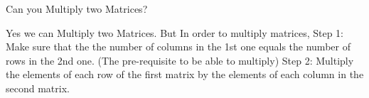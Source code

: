 \documentclass[11pt]{article}
\begin{document}
Can you Multiply two Matrices?

Yes we can Multiply two Matrices. But In order to multiply matrices, Step 1: Make sure that the the number of columns in the 1st one equals the number of rows in the 2nd one. (The pre-requisite to be able to multiply) Step 2: Multiply the elements of each row of the first matrix by the elements of each column in the second matrix.
\end{document}
